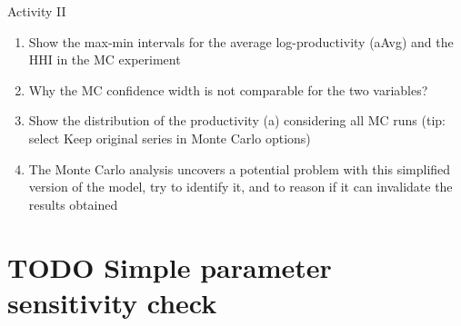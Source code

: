 \documentclass[bigger,aspectratio=169]{beamer}
\begin{document}
\begin{frame}[label={sec:orgdc9ff9a}]{Activity II}
\begin{enumerate}
\item Show the max-min intervals for the average log-productivity (\alert{aAvg}) and the \alert{HHI} in the MC experiment
\item Why the MC confidence width is not comparable for the two variables?
\item Show the distribution of the productivity (\alert{a}) considering all MC runs (tip: select \alert{Keep original series in Monte Carlo options})
\item The Monte Carlo analysis uncovers a potential problem with this simplified version of the model, try to identify it, and to reason if it can invalidate the results obtained
\end{enumerate}
\end{frame}
\section{{\bfseries\sffamily TODO} Simple parameter sensitivity check}
\label{sec:org90e6444}
\end{document}
